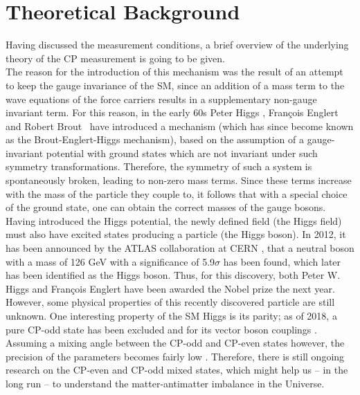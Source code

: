
\chapter{Theoretical Background} %

\label{Chapter3} %
Having discussed the measurement conditions, a brief overview of the underlying theory of the CP measurement is going to be given.\\
The reason for the introduction of this mechanism was the result of an attempt to keep the gauge invariance of the SM, since an addition of a mass term to the wave equations of the force carriers results in a supplementary non-gauge invariant term. For this reason, in the early 60s Peter Higgs \parencite{Reference1}, François Englert and Robert Brout~\parencite{Reference2} have introduced a mechanism (which has since become known as the Brout-Englert-Higgs mechanism), based on the assumption of a gauge-invariant potential with ground states which are not invariant under such symmetry transformations. Therefore, the symmetry of such a system is spontaneously broken, leading to non-zero mass terms. Since these terms increase with the mass of the particle they couple to, it follows that with a special choice of the ground state, one can obtain the correct masses of the gauge bosons.\\
Having introduced the Higgs potential, the newly defined field (the Higgs field) must also have excited states producing a particle (the Higgs boson). In 2012, it has been announced by the ATLAS collaboration at CERN \parencite{Higgs2,Higgs1}, that a neutral boson with a mass of 126 GeV with a significance of 5.9$\sigma$ has been found, which later has been identified as the Higgs boson. Thus, for this discovery, both Peter W. Higgs and François Englert have been awarded the Nobel prize the next year.\\
However, some physical properties of this recently discovered particle are still unknown. One interesting property of the SM Higgs is its parity; as of 2018, a pure CP-odd state has been excluded and for its vector boson couplings \parencite{PDG_source}. Assuming a mixing angle between the CP-odd and CP-even states however, the precision of the parameters becomes fairly low \parencite{PDG}. Therefore, there is still ongoing research on the CP-even and CP-odd mixed states, which might help us -- in the long run -- to understand the matter-antimatter imbalance in the Universe.\\

